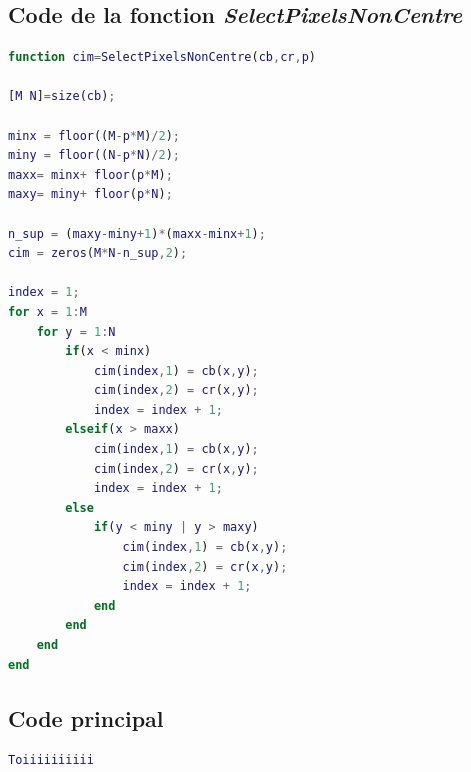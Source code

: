 \documentclass[11pt,a4paper]{article}
\begin{document}
\subsection{Code de la fonction \emph{SelectPixelsNonCentre}}

\begin{lstlisting}[language=matlab]
function cim=SelectPixelsNonCentre(cb,cr,p)

[M N]=size(cb);

minx = floor((M-p*M)/2);
miny = floor((N-p*N)/2);
maxx= minx+ floor(p*M);
maxy= miny+ floor(p*N);

n_sup = (maxy-miny+1)*(maxx-minx+1);
cim = zeros(M*N-n_sup,2);

index = 1;
for x = 1:M
    for y = 1:N
        if(x < minx)
            cim(index,1) = cb(x,y);
            cim(index,2) = cr(x,y);
            index = index + 1;
        elseif(x > maxx)
            cim(index,1) = cb(x,y);
            cim(index,2) = cr(x,y);
            index = index + 1;
        else
            if(y < miny | y > maxy)
                cim(index,1) = cb(x,y);
                cim(index,2) = cr(x,y);
                index = index + 1;
            end
        end
    end
end
\end{lstlisting}

\subsection{Code principal}

\begin{lstlisting}[language=matlab]
Toiiiiiiiiii
\end{lstlisting}
\end{document}

